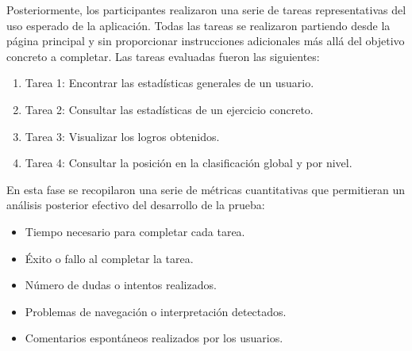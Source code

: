 Posteriormente, los participantes realizaron una serie de tareas representativas del uso esperado de la aplicación. Todas las tareas se realizaron partiendo desde la página principal y sin proporcionar instrucciones adicionales más allá del objetivo concreto a completar.
Las tareas evaluadas fueron las siguientes:

\begin{enumerate}
    \item Tarea 1: Encontrar las estadísticas generales de un usuario.
    \item Tarea 2: Consultar las estadísticas de un ejercicio concreto.
    \item Tarea 3: Visualizar los logros obtenidos.
    \item Tarea 4: Consultar la posición en la clasificación global y por nivel.
\end{enumerate}

En esta fase se recopilaron una serie de métricas cuantitativas que permitieran un análisis posterior efectivo del desarrollo de la prueba:

\begin{itemize}
    \item Tiempo necesario para completar cada tarea.
    \item Éxito o fallo al completar la tarea.
    \item Número de dudas o intentos realizados.
    \item Problemas de navegación o interpretación detectados.
    \item Comentarios espontáneos realizados por los usuarios.
\end{itemize}

